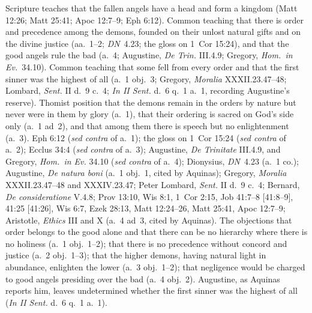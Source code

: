  {Scripture teaches that the fallen angels have a head and form a kingdom
 (Matt 12:26; Matt 25:41; Apoc 12:7--9; Eph 6:12). Common teaching that
 there is order and precedence among the demons, founded on their unlost
 natural gifts and on the divine justice (aa.~1--2; \emph{DN}~4.23; the
 gloss on 1~Cor 15:24), and that the good angels rule the bad (a.~4;
 Augustine, \emph{De Trin.} III.4.9; Gregory, \emph{Hom.\ in Ev.}\ 34.10). Common
 teaching that some fell from every order and that the first sinner was the
 highest of all (a.~1 obj.~3; Gregory, \emph{Moralia} XXXII.23.47--48;
 Lombard, \emph{Sent.} II d.~9 c.~4; \emph{In II Sent.} d.~6 q.~1 a.~1,
 recording Augustine's reserve). Thomist position that the demons remain in
 the orders by nature but never were in them by glory (a.~1), that their
 ordering is sacred on God's side only (a.~1 ad~2), and that among them there
 is speech but no enlightenment (a.~3).}
 {Eph 6:12 (\emph{sed contra} of a.~1); the gloss on 1~Cor 15:24
 (\emph{sed contra} of a.~2); Ecclus 34:4 (\emph{sed contra} of a.~3);
 Augustine, \emph{De Trinitate} III.4.9, and Gregory,
 \emph{Hom.\ in Ev.} 34.10 (\emph{sed contra} of a.~4); Dionysius,
 \emph{DN}~4.23 (a.~1 co.); Augustine,
 \emph{De natura boni} (a.~1 obj.~1, cited by Aquinas); Gregory,
 \emph{Moralia} XXXII.23.47--48 and XXXIV.23.47; Peter Lombard, \emph{Sent.} II d.~9
 c.~4; Bernard, \emph{De consideratione} V.4.8; Prov 13:10, Wis 8:1, 1~Cor
 2:15, Job 41:7--8 [41:8--9], 41:25 [41:26], Wis 6:7, Ezek 28:13, Matt 12:24--26, Matt 25:41,
 Apoc 12:7--9; Aristotle, \emph{Ethics} III and X (a.~4 ad~3, cited by
 Aquinas).}
 {The objections that order belongs to the good alone and that there can be
 no hierarchy where there is no holiness (a.~1 obj.~1--2); that there is no
 precedence without concord and justice (a.~2 obj.~1--3); that the higher
 demons, having natural light in abundance, enlighten the lower (a.~3
 obj.~1--2); that negligence would be charged to good angels presiding over
 the bad (a.~4 obj.~2). Augustine, as Aquinas reports him, leaves
 undetermined whether the first sinner was the highest of all (\emph{In II
 Sent.} d.~6 q.~1 a.~1).}
